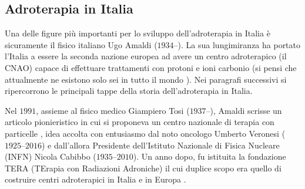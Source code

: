 \documentclass[12pt,a4paper,twoside]{report}
\begin{document}
	\subsection{Adroterapia in Italia}\label{sec:adroterapia_italia}
	Una delle figure più importanti per lo sviluppo dell'adroterapia in Italia è sicuramente il fisico italiano Ugo Amaldi ($1934$--). La sua lungimiranza ha portato l'Italia a essere la seconda nazione europea ad avere un centro adroterapico (il CNAO) capace di effettuare trattamenti con protoni e ioni carbonio (si pensi che attualmente ne esistono solo sei in tutto il mondo \cite{asimmetrie_curareCLP}). Nei paragrafi successivi si ripercorrono le principali tappe della storia dell'adroterapia in Italia.
	
	Nel $1991$, assieme al fisico medico Giampiero Tosi ($1937$--), Amaldi scrisse un articolo pionieristico in cui si proponeva un centro nazionale di terapia con particelle \cite{amaldi1991per}, idea accolta con entusiasmo dal noto oncologo Umberto Veronesi ($1925$--$2016$) e dall'allora Presidente dell'Istituto Nazionale di Fisica Nucleare (INFN) Nicola Cabibbo ($1935$--$2010$). Un anno dopo, fu istituita la fondazione TERA (TErapia con Radiazioni Adroniche) il cui duplice scopo era quello di costruire centri adroterapici in Italia e in Europa \cite{amaldi_article}.
\end{document}

